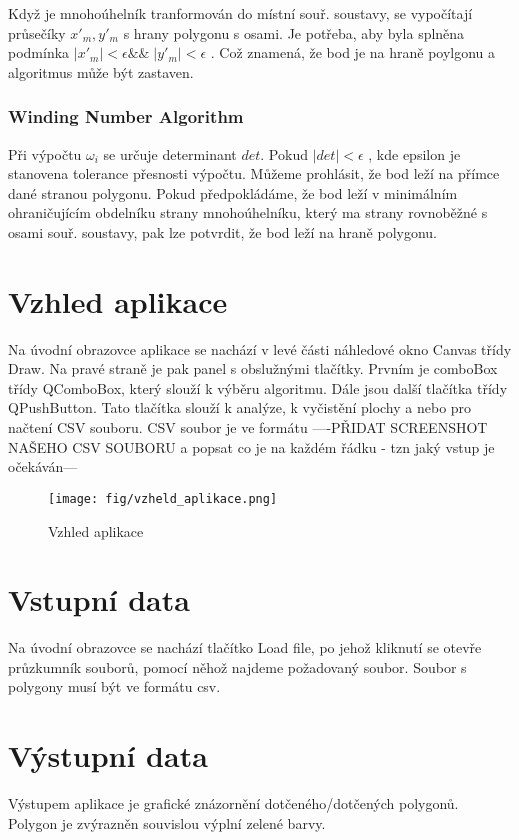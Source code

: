 \documentclass[oneside,12pt,a4paper]{book}
\begin{document}
Když je mnohoúhelník tranformován do místní souř. soustavy, se vypočítají průsečíky $x'_m, y'_m $ s hrany polygonu s osami. Je potřeba, aby byla splněna podmínka \; $|x'_m| < \epsilon \&\& \; |y'_m| < \epsilon$ .
Což znamená, že bod je na hraně poylgonu a algoritmus může být zastaven.

\subsection{Winding Number Algorithm}

Při výpočtu $\omega_i$ se určuje determinant $det$. Pokud $|det| < \epsilon$ , kde epsilon je stanovena tolerance přesnosti výpočtu. Můžeme prohlásit, že bod leží na přímce dané stranou polygonu. Pokud předpokládáme, že bod leží v minimálním ohraničujícím obdelníku strany mnohoúhelníku, který ma strany rovnoběžné s osami souř. soustavy, pak lze potvrdit, že bod leží na hraně polygonu.


\chapter{Vzhled aplikace}
Na úvodní obrazovce aplikace se nachází v levé části náhledové okno Canvas třídy Draw.
Na pravé straně je pak panel s obslužnými tlačítky. Prvním je comboBox třídy QComboBox, který
slouží k výběru algoritmu. Dále jsou další tlačítka třídy QPushButton. Tato tlačítka slouží k analýze, k vyčistění plochy a nebo pro načtení CSV souboru.
CSV soubor je ve formátu
----PŘIDAT SCREENSHOT NAŠEHO CSV SOUBORU a popsat co je na každém řádku - tzn jaký vstup je očekáván---

\begin{figure}[ht!]
    \centering
    \texttt{[image: fig/vzheld\_aplikace.png]}
    \caption{Vzhled aplikace}
    \label{fig:Zadání úlohy}
\end{figure}


\chapter{Vstupní data} 
Na úvodní obrazovce se nachází tlačítko Load file, po jehož kliknutí se otevře průzkumník souborů,
pomocí něhož najdeme požadovaný soubor. Soubor s polygony musí být ve formátu csv.

\chapter{Výstupní data} 
Výstupem aplikace je grafické znázornění dotčeného/dotčených polygonů. Polygon je zvýrazněn
souvislou výplní zelené barvy.
\end{document}
